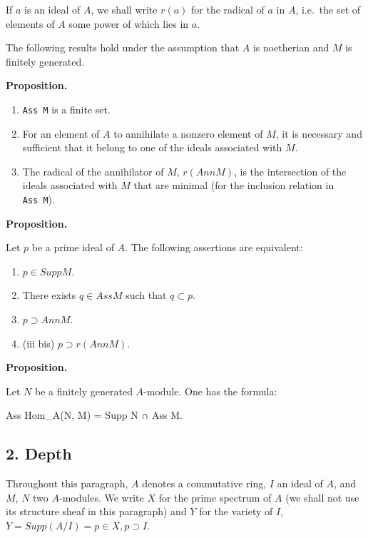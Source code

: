 \documentclass[
]{article}
\newenvironment{Shaded}{}{}
\newcommand{\NormalTok}[1]{#1}
\providecommand{\tightlist}{%
  \setlength{\itemsep}{0pt}\setlength{\parskip}{0pt}}
\begin{document}
If \(a\) is an ideal of \(A\), we shall write \(r(a)\) for the radical
of \(a\) in \(A\), i.e.~the set of elements of \(A\) some power of which
lies in \(a\).

The following results hold under the assumption that \(A\) is noetherian
and \(M\) is finitely generated.

\textbf{Proposition.}

\begin{enumerate}
\def\labelenumi{\arabic{enumi}.}
\item
  \texttt{Ass\ M} is a finite set.
\item
  For an element of \(A\) to annihilate a nonzero element of \(M\), it
  is necessary and sufficient that it belong to one of the ideals
  associated with \(M\).
\item
  The radical of the annihilator of \(M\), \(r(Ann M)\), is the
  intersection of the ideals associated with \(M\) that are minimal (for
  the inclusion relation in \texttt{Ass\ M}).
\end{enumerate}

\textbf{Proposition.}

Let \(p\) be a prime ideal of \(A\). The following assertions are
equivalent:

\begin{enumerate}
\def\labelenumi{\arabic{enumi}.}
\tightlist
\item
  \(p \in Supp M\).
\item
  There exists \(q \in Ass M\) such that \(q \subset p\).
\item
  \(p \supset Ann M\).
\item
  (iii bis) \(p \supset r(Ann M)\).
\end{enumerate}

\textbf{Proposition.}

Let \(N\) be a finitely generated \(A\)-module. One has the formula:

\begin{Shaded}
\begin{Highlighting}[]
\NormalTok{Ass Hom\_A(N, M) = Supp N ∩ Ass M.}
\end{Highlighting}
\end{Shaded}

\subsection{2. Depth}\label{depth}

Throughout this paragraph, \(A\) denotes a commutative ring, \(I\) an
ideal of \(A\), and \(M\), \(N\) two \(A\)-modules. We write \(X\) for
the prime spectrum of \(A\) (we shall not use its structure sheaf in
this paragraph) and \(Y\) for the variety of \(I\),
\(Y = Supp(A/I) = {p \in X, p \supset I}\).
\end{document}
